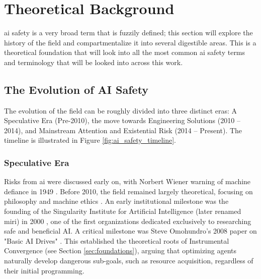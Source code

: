 \chapter{Theoretical Background}\label{chap:theoredical_background}



	\gls{ai} safety is a very broad term that is fuzzily defined; this section will explore the history of the field and compartmentalize it into several digestible areas. This is a theoretical foundation that will look into all the most common \gls{ai} safety terms and terminology that will be looked into across this work.


	\section{The Evolution of AI Safety}

	The evolution of the field can be roughly divided into three distinct eras: A Speculative Era (Pre-2010), the move towards Engineering Solutions (2010 -- 2014), and Mainstream Attention and Existential Risk (2014 -- Present). The timeline is illustrated in Figure \ref{fig:ai_safety_timeline}.

	

	\subsection*{Speculative Era}

	Risks from \gls{ai} were discussed early on, with Norbert Wiener warning of machine defiance in 1949 \cite{wiener1950}. Before 2010, the field remained largely theoretical, focusing on philosophy and machine ethics \cite{whitby1988}. An early institutional milestone was the founding of the Singularity Institute for Artificial Intelligence (later renamed \gls{miri}) in 2000 \cite{miri_founding}, one of the first organizations dedicated exclusively to researching safe and beneficial AI. A critical milestone was Steve Omohundro's 2008 paper on "Basic AI Drives" \cite{omohundro2008basic}. This established the theoretical roots of Instrumental Convergence (see Section \ref{sec:foundations}), arguing that optimizing agents naturally develop dangerous sub-goals, such as resource acquisition, regardless of their initial programming.

